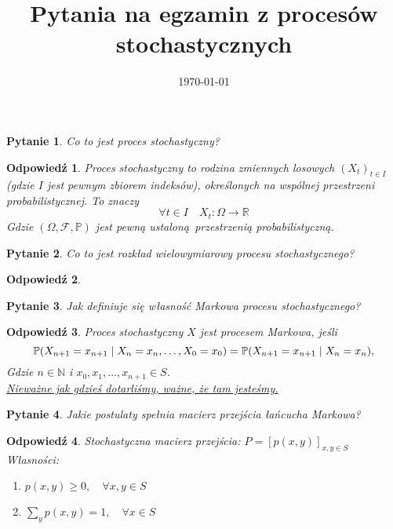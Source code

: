 \documentclass[12pt]{mwart}
\title{Pytania na egzamin z procesów stochastycznych}
\date{\today}
\theoremstyle{plain}
\newtheorem{pytanie}{Pytanie}
\theoremstyle{break}
\newtheorem*{odpowiedź}{Odpowiedź}
\begin{document}

\begin{pytanie}
Co to jest proces stochastyczny?
\end{pytanie}
\begin{odpowiedź}
    Proces stochastyczny to rodzina zmiennych losowych $(X_t)_{t\in I}$
    (gdzie $I$ jest pewnym zbiorem indeksów), określonych na wspólnej
    przestrzeni probabilistycznej. To znaczy \[
    \forall t \in I \quad X_t : \Omega \to \mathbb{R}
    \]
    Gdzie $(\Omega, \mathcal{F}, \mathbb{P})$ jest pewną ustaloną przestrzenią
    probabilistyczną.
\end{odpowiedź}


\begin{pytanie}
Co to jest rozkład wielowymiarowy procesu stochastycznego?
\end{pytanie}
\begin{odpowiedź}
\end{odpowiedź}


\begin{pytanie}
Jak definiuje się własność Markowa procesu stochastycznego?
\end{pytanie}
\begin{odpowiedź}
    Proces stochastyczny $X$ jest procesem Markowa, jeśli \[
    \mathbb{P}(X_{n+1}=x_{n+1}\mid X_n=x_n,\ldots ,X_0=x_0)\\
    = \mathbb{P}(X_{n+1}=x_{n+1}\mid X_n=x_n),
    \]
    Gdzie $n \in \mathbb{N}$ i $x_0, x_1, \ldots, x_{n+1} \in S$.\\
    \underline{Nieważne jak gdzieś dotarliśmy, ważne, że tam jesteśmy.}
\end{odpowiedź}


\begin{pytanie}
Jakie postulaty spełnia macierz przejścia łańcucha Markowa?
\end{pytanie}
\begin{odpowiedź}
    Stochastyczna macierz przejścia: $P = [p(x,y)]_{x, y\in S}$\\
    Własności:
    \begin{enumerate}
        \item $p(x, y) \geq 0, \quad \forall x, y \in S$
        \item $\sum_{y} p(x, y) = 1, \quad \forall x \in S$
    \end{enumerate}
\end{odpowiedź}
\end{document}
